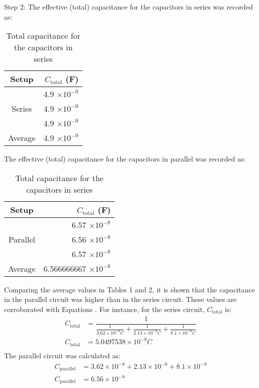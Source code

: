 \documentclass [12pt, letterpaper, twoside] {article}
\begin{document}
\noindent
Step 2:
The effective (total) capacitance for the capacitors in series was recorded as:
\begin{table}[h!]
  \centering
  \begin{tabular}{| c | r |}
    \hline\hline
    Setup & \(C_{\text{total}}\) (F) \\
    \hline
    \multirow {3}{*}{Series} & 4.9 \(\times{10}^{-9}\) \\
    & 4.9 \(\times{10}^{-9}\) \\
    & 4.9 \(\times{10}^{-9}\) \\
    \hline
    Average & 4.9 \(\times{10}^{-9}\) \\
    \hline\hline
  \end{tabular}
  \caption{Total capacitance for the capacitors in series}
\end{table}

\noindent
The effective (total) capacitance for the capacitors in parallel was recorded as:
\begin{table}[h!]
  \centering
  \begin{tabular}{| c | r |}
    \hline\hline
    Setup & \(C_{\text{total}}\) (F) \\
    \hline
    \multirow {3}{*}{Parallel} & 6.57 \(\times{10}^{-8}\) \\
    & 6.56 \(\times{10}^{-8}\) \\
    & 6.57 \(\times{10}^{-8}\) \\
    \hline
    Average & 6.566666667 \(\times{10}^{-8}\) \\
    \hline\hline
  \end{tabular}
  \caption{Total capacitance for the capacitors in series}
\end{table}

Comparing the average values in Tables 1 and 2, it is shown that the capacitance in the parallel circuit was higher than in the series circuit. These values are corroborated with Equations . For instance, for the series circuit, \(C_{\text{total}}\) is:
\begin{equation*}
  \begin{split}
    C_{\text{total}} &= \dfrac{1}{\tfrac{1}{3.62\times10^{-8}C} + \tfrac{1}{2.13\times10^{-8}C} + \tfrac{1}{8.1\times10^{-9}C}} \\
    C_{\text{total}} &= 5.0497538\times10^{-9}C \\
  \end{split}
\end{equation*}
The parallel circuit was calculated as:
\begin{equation*}
  \begin{split}
    C_{\text{parallel}} &= 3.62\times10^{-8} + 2.13\times10^{-8} + 8.1\times10^{-9} \\
    C_{\text{parallel}} &= 6.56\times10^{-8} \\
  \end{split}
\end{equation*}
\end{document}
